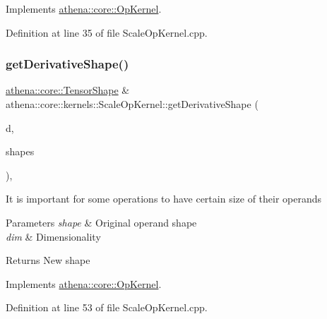 Implements \mbox{\hyperlink{classathena_1_1core_1_1_op_kernel_ad500db1afc5a7c10acff8ecb8f1bee4d}{athena\+::core\+::\+Op\+Kernel}}.



Definition at line 35 of file Scale\+Op\+Kernel.\+cpp.

\mbox{\label{classathena_1_1core_1_1kernels_1_1_scale_op_kernel_ad7c63973c62e28c0ad3d854ce16debf1}} 
\subsubsection{\texorpdfstring{get\+Derivative\+Shape()}{getDerivativeShape()}}
{\footnotesize\ttfamily \mbox{\hyperlink{classathena_1_1core_1_1_tensor_shape}{athena\+::core\+::\+Tensor\+Shape}} \& athena\+::core\+::kernels\+::\+Scale\+Op\+Kernel\+::get\+Derivative\+Shape (\begin{DoxyParamCaption}\item[{int}]{d,  }\item[{std\+::vector$<$ \mbox{\hyperlink{classathena_1_1core_1_1_tensor_shape}{athena\+::core\+::\+Tensor\+Shape}} $>$ \&}]{shapes }\end{DoxyParamCaption})\hspace{0.3cm}{\ttfamily [override]}, {\ttfamily [virtual]}}

It is important for some operations to have certain size of their operands 
\begin{DoxyParams}{Parameters}
{\em shape} & Original operand shape \\
\hline
{\em dim} & Dimensionality \\
\hline
\end{DoxyParams}
\begin{DoxyReturn}{Returns}
New shape 
\end{DoxyReturn}


Implements \mbox{\hyperlink{classathena_1_1core_1_1_op_kernel_ad95af6dd184ce7ee9182ec7ca54b6c4d}{athena\+::core\+::\+Op\+Kernel}}.



Definition at line 53 of file Scale\+Op\+Kernel.\+cpp.

